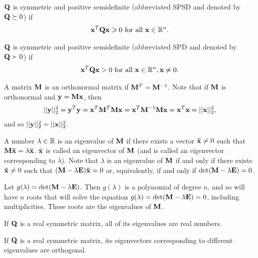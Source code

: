 \begin{definition}{}{}
    $\bold{Q}$ is symmetric and positive semidefinite (abbreviated SPSD and denoted by $\bold{Q}\succeq 0$) if 
    \begin{align*}
        \bold{x}^T\bold{Q}\bold{x}\geqslant 0 \text{ for all } \bold{x}\in \mathbb{R}^n.
    \end{align*}
\end{definition}

\begin{definition}{}{}
    $\bold{Q}$ is symmetric and positive semidefinite (abbreviated SPD and denoted by $\bold{Q}\succ 0$) if 
    \begin{align*}
        \bold{x}^T\bold{Q}\bold{x}> 0 \text{ for all } \bold{x}\in \mathbb{R}^n, \bold{x}\neq 0.
    \end{align*}
\end{definition}

A matrix $\bold{M}$ is an orthonormal matrix if $\bold{M}^T=\bold{M}^{-1}$.
Note that if $\bold{M}$ is orthonormal and $\bold{y}=\bold{M}\bold{x}$, then 
\begin{align*}
    ||\bold{y}||^2_2=\bold{y}^T\bold{y}=\bold{x}^T\bold{M}^T\bold{M}\bold{x}=\bold{x}^T\bold{M}^{-1}\bold{M}\bold{x}=\bold{x}^T\bold{x}=||\bold{x}||^2_2,
\end{align*}
and so $||\bold{y}||_2^2=||\bold{x}||_2^2$.

A number $\lambda\in\mathbb{R}$ is an eigenvalue of $\bold{M}$ if there exists 
a vector $\bold{\bar{x}}\neq 0$ such that $\bold{M}\bold{\bar{x}}=\lambda \bold{\bar{x}}$.
$\bold{\bar{x}}$ is called an eigenvector of $\bold{M}$ (and is called an eigenvector corresponding to $\lambda$).
Note that $\lambda$ is an eigenvalue of $\bold{M}$ if and only if there exists $\bold{\bar{x}}\neq 0$ such that 
$(\bold{M}-\lambda \bold{E})\bold{\bar{x}}=0$ or, equivalently, if and only if $\text{det}(\bold{M}-\lambda \bold{E})=0$.

Let $g(\lambda)=\text{det}(\bold{M}-\lambda \bold{E})$. Then $g(\lambda)$ is 
a polynomial of degree $n$, and so will have $n$ roots 
that will solve the equation $g(\lambda)=\text{det}(\bold{M}-\lambda \bold{E})=0$, 
including multiplicities. These roots are the eigenvalues of $\bold{M}$.


\begin{proposition}{}{}
    If $\bold{Q}$ is a real symmetric matrix, all of its eigenvalues are real numbers.
\end{proposition}

\begin{proposition}{}{}
    If $\bold{Q}$ is a real symmetric matrix, 
    its eigenvectors corresponding to different eigenvalues are orthogonal.
\end{proposition}

